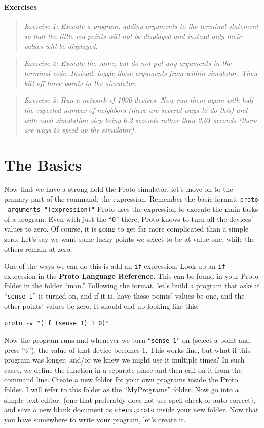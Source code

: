 \documentclass{article}
\newcommand\code[1]{\begin{center}\var{#1}\end{center}}
\newcommand\problem[1]{\begin{quote}{\em #1}\end{quote}}
\newcommand\var[1]{{\tt #1}}
\newcommand\qvar[1]{``{\tt #1}''}
\begin{document}
\paragraph{Exercises}

\problem{Exercise 1: Execute a program, adding arguments to the
  terminal statement so that the little red points will not be
  displayed and instead only their values will be displayed.}

\problem{Exercise 2: Execute the same, but do not put any arguments in
  the terminal code. Instead, toggle these arguments from within
  simulator. Then kill off three points in the simulator.}

\problem{Exercise 3: Run a network of 1000 devices. Now run them again
  with half the expected number of neighbors (there are several ways
  to do this) and with each simulation step being 0.2 seconds rather
  than 0.01 seconds (there are ways to speed up the simulator).}

\section{The Basics}

Now that we have a strong hold the Proto simulator, let's move on to
the primary part of the command: the expression. Remember the basic
format: \var{proto -arguments "(expression)"} Proto uses the
expression to execute the main tasks of a program.  Even with just the
\qvar{0} there, Proto knows to turn all the devices' values to zero.
Of course, it is going to get far more complicated than a simple zero.
Let's say we want some lucky points we select to be at value one,
while the others remain at zero.

One of the ways we can do this is add an \var{if} expression.  Look up
an \var{if} expression in the {\bf Proto Language Reference}.  This
can be found in your Proto folder in the folder ``man.''  Following
the format, let's build a program that asks if \qvar{sense 1} is
turned on, and if it is, have those points' values be one, and the
other points' values be zero.  It should end up looking like this:

\code{proto -v "(if (sense 1) 1 0)"}

Now the program runs and whenever we turn \qvar{sense 1} on (select a
point and press ``t''), the value of that device becomes 1.  This
works fine, but what if this program was longer, and/or we knew we
might use it multiple times?  In such cases, we define the function in
a separate place and then call on it from the command line.  Create a
new folder for your own programs inside the Proto folder.  I will
refer to this folder as the ``MyPrograms'' folder.  Now go into a
simple text editor, (one that preferably does not use spell check or
auto-correct), and save a new blank document as \var{check.proto}
inside your new folder.  Now that you have somewhere to write your
program, let's create it.
\end{document}
